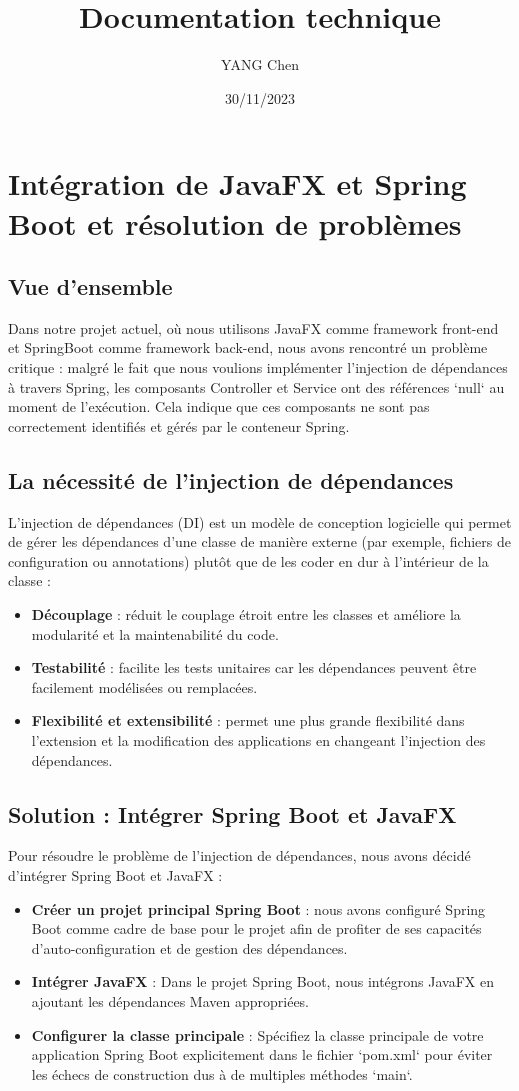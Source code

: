 \documentclass{article}
\title{Documentation technique}
\date{30/11/2023}
\author{YANG Chen}
\begin{document}
\maketitle
\tableofcontents
\newpage
\section{Intégration de JavaFX et Spring Boot et résolution de problèmes}
\subsection{Vue d'ensemble}
  Dans notre projet actuel, où nous utilisons JavaFX comme framework front-end et SpringBoot comme framework back-end, nous avons rencontré un problème critique : malgré le fait que nous voulions implémenter l'injection de dépendances à travers Spring, les composants Controller et Service ont des références `null` au moment de l'exécution. Cela indique que ces composants ne sont pas correctement identifiés et gérés par le conteneur Spring.
\subsection{La nécessité de l'injection de dépendances}
L'injection de dépendances (DI) est un modèle de conception logicielle qui permet de gérer les dépendances d'une classe de manière externe (par exemple, fichiers de configuration ou annotations) plutôt que de les coder en dur à l'intérieur de la classe :
\begin{itemize}
  \item \textbf{Découplage} : réduit le couplage étroit entre les classes et améliore la modularité et la maintenabilité du code.
  \item \textbf{Testabilité} : facilite les tests unitaires car les dépendances peuvent être facilement modélisées ou remplacées.
  \item \textbf{Flexibilité et extensibilité} : permet une plus grande flexibilité dans l'extension et la modification des applications en changeant l'injection des dépendances.
\end{itemize}
\subsection{Solution : Intégrer Spring Boot et JavaFX}
Pour résoudre le problème de l'injection de dépendances, nous avons décidé d'intégrer Spring Boot et JavaFX :
\begin{itemize}
  \item \textbf{Créer un projet principal Spring Boot} : nous avons configuré Spring Boot comme cadre de base pour le projet afin de profiter de ses capacités d'auto-configuration et de gestion des dépendances.
  \item \textbf{Intégrer JavaFX} : Dans le projet Spring Boot, nous intégrons JavaFX en ajoutant les dépendances Maven appropriées.
  \item \textbf{Configurer la classe principale} : Spécifiez la classe principale de votre application Spring Boot explicitement dans le fichier `pom.xml` pour éviter les échecs de construction dus à de multiples méthodes `main`.
\end{itemize}
\end{document}
